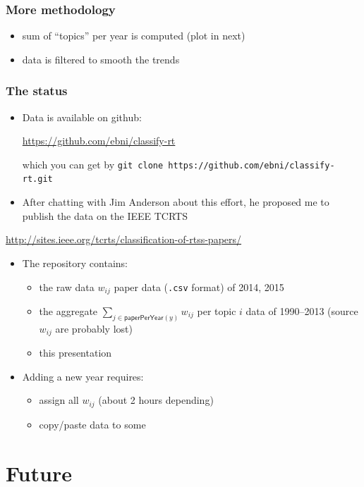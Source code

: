 \documentclass[ignorenonframetext,mathserif]{beamer} %
\begin{document}
\begin{frame}
  \frametitle{More methodology}
  \begin{itemize}
  \item sum of ``topics'' per year is computed (plot in next)
  \item data is filtered to smooth the trends
  \end{itemize}
\end{frame}
  

\begin{frame}[fragile]
  \frametitle{The status}

  \begin{itemize}
  \item Data is available on github:
    \begin{center}
      \url{https://github.com/ebni/classify-rt}
    \end{center}
    which you can get by
    \verb|git clone https://github.com/ebni/classify-rt.git|
  \item After chatting with Jim Anderson about this effort, he
    proposed me to publish the data on the IEEE TCRTS
  \end{itemize}
  \begin{center}
    \url{http://sites.ieee.org/tcrts/classification-of-rtss-papers/}
  \end{center}
  \begin{itemize}
  \item The repository contains:
    \begin{itemize}
    \item the raw data $w_{ij}$ paper data (\texttt{.csv} format) of
      2014, 2015
    \item the aggregate $\sum_{j\in\mathsf{paperPerYear}(y)}w_{ij}$
      per topic $i$ data of 1990--2013 (source $w_{ij}$ are probably
      lost)
    \item this presentation
    \end{itemize}
  \item Adding a new year requires:
    \begin{itemize}
    \item assign all $w_{ij}$ (about 2 hours depending)
    \item copy/paste data to some 
    \end{itemize}
  \end{itemize}
\end{frame}

\section{Future}
\end{document}
